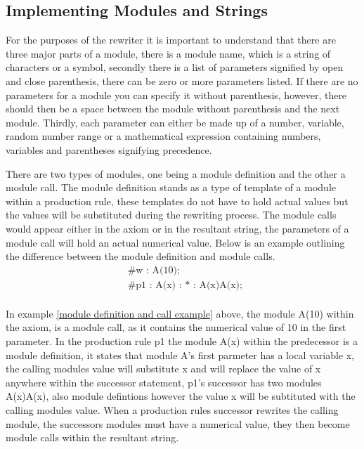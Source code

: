 \subsection{Implementing Modules and Strings}

\begin{flushleft}

For the purposes of the rewriter it is important to understand that there are three major parts of a module, there is a module name, which is a string of characters or a symbol, secondly there is a list of parameters signified by open and close parenthesis, there can be zero or more parameters listed. If there are no parameters for a module you can specify it without parenthesis, however, there should then be a space between the module without parenthesis and the next module. Thirdly, each parameter can either be made up of a number, variable, random number range or a mathematical expression containing  numbers, variables and parentheses signifying precedence. \\   

\vspace{5mm}

There are two types of modules, one being a module definition and the other a module call. The module definition stands as a type of template of a module within a production rule, these templates do not have to hold actual values but the values will be substituted during the rewriting process. The module calls would appear either in the axiom or in the resultant string, the parameters of a module call will hold an actual numerical value. Below is an example outlining the difference between the module definition and module calls.\\ 

\begin{equation} \label{module definition and call example}
\begin{aligned}
	&\text{\#w : A(10);}\\
	&\text{\#p1 : A(x) : * : A(x)A(x); }\\
\end{aligned}
\end{equation}

In example \ref{module definition and call example} above, the module A(10) within the axiom, is a module call, as it contains the numerical value of 10 in the first parameter. In the production rule p1 the module A(x) within the predecessor is a module definition, it states that module A's first parmeter has a local variable x, the calling modules value will substitute x and will replace the value of x anywhere within the successor statement, p1's successor has two modules A(x)A(x), also module defintions however the value x will be subtituted with the calling modules value. When a production rules successor rewrites the calling module, the successors modules must have a numerical value, they then become module calls within the resultant string. \\ 


\end{flushleft}
